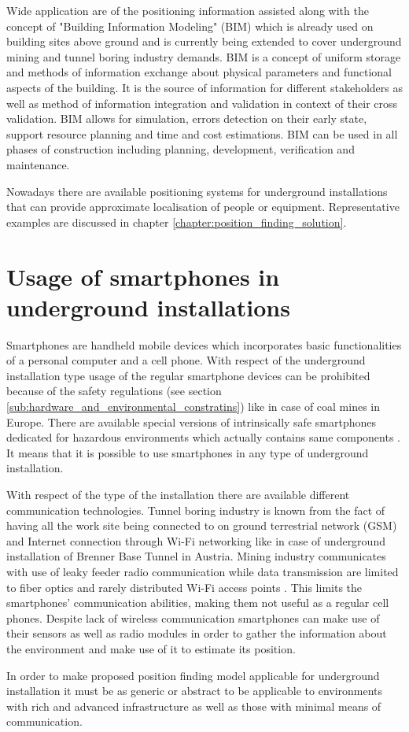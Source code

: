 \documentclass[../main.tex]{subfiles}
\begin{document}
Wide application are of the positioning information assisted along with the concept of "Building Information Modeling" (BIM) which is already used on building sites above ground and is currently being extended to cover underground mining and tunnel boring industry demands\cite{article_sensors_for_indoor_navi}. BIM is a concept of uniform storage and methods of information exchange about physical parameters and functional aspects of the building. It is the source of information for different stakeholders as well as method of information integration and validation in context of their cross validation. BIM allows for simulation, errors detection on their early state, support resource planning and time and cost estimations. BIM can be used in all phases of construction including planning, development, verification and maintenance.


Nowadays there are available positioning systems for underground installations that can provide approximate localisation of people or equipment. Representative examples are discussed in chapter \ref{chapter:position_finding_solution}.


\section{Usage of smartphones in underground installations}

Smartphones are handheld mobile devices which incorporates basic functionalities of a personal computer and a cell phone. With respect of the underground installation type usage of the regular smartphone devices can be prohibited because of the safety regulations (see section \ref{sub:hardware_and_environmental_constratins}) like in case of coal mines in Europe\cite{Thesis_CM}. There are available special versions of intrinsically safe smartphones dedicated for hazardous environments which actually contains same components \cite{misc_atex_smartphone_brochure}. It means that it is possible to use smartphones in any type of underground installation.

With respect of the type of the installation there are available different communication technologies. Tunnel boring industry is known from the fact of having all the work site being connected to on ground terrestrial network (GSM) and Internet connection through Wi-Fi networking like in case of underground installation of Brenner Base Tunnel in Austria. Mining industry communicates with use of leaky feeder radio communication while data transmission are limited to fiber optics and rarely distributed Wi-Fi access points \cite{thesis_tablet_positioning}. This limits the smartphones' communication abilities, making them not useful as a regular cell phones. Despite lack of wireless communication smartphones can make use of their sensors as well as radio modules in order to gather the information about the environment and make use of it to estimate its position.

In order to make proposed position finding model applicable for underground installation it must be as generic or abstract to be applicable to environments with rich and advanced infrastructure as well as those with minimal means of communication.
\end{document}

